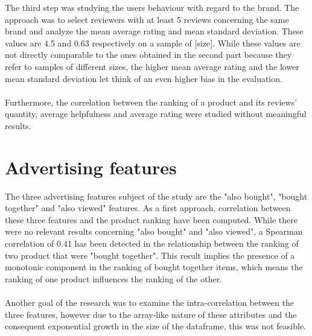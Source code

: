 \documentclass[11pt]{article}
\begin{document}
The third step was studying the users behaviour with regard to the brand. The approach was to select reviewers with at least 5 reviews concerning the same brand and analyze the mean average rating and mean standard deviation. These values are 4.5 and 0.63 respectively on a sample of [size]. While these values are not directly comparable to the ones obtained in the second part because they refer to samples of different sizes, the higher mean average rating and the lower mean standard deviation let think of an even higher bias in the evaluation.\\\\
Furthermore, the correlation between the ranking of a product and its reviews' quantity, average helpfulness and average rating were studied without meaningful results.

\section{Advertising features}
  The three advertising features subject of the study are the "also bought", "bought together" and "also viewed" features. As a first approach, correlation between these three features and the product ranking have been computed. While there were no relevant results concerning "also bought" and "also viewed", a Spearman correlation of 0.41 has been detected in the relationship between the ranking of two product that were "bought together". This result implies the presence of a monotonic component in the ranking of bought together items, which means the ranking of one product influences the ranking of the other. \\\\
Another goal of the research was to examine the intra-correlation between the three features, however due to the array-like nature of these attributes and the consequent exponential growth in the size of the dataframe, this was not feasible.
\end{document}
